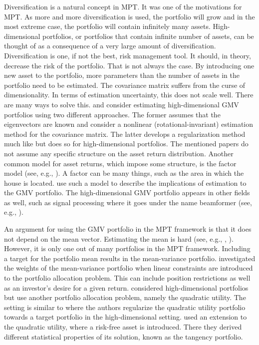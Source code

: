 Diversification is a natural concept in MPT.
It was one of the motivations for MPT.
As more and more diversification is used, the portfolio will grow and in the most extreme case, the portfolio will contain infinitely many assets.
High-dimensional portfolios, or portfolios that contain infinite number of assets, can be thought of as a consequence of a very large amount of diversification.
Diversification is one, if not the best, risk management tool.
It should, in theory, decrease the risk of the portfolio. 
That is not always the case.
By introducing one new asset to the portfolio, more parameters than the number of assets in the portfolio need to be estimated. 
The covariance matrix suffers from the curse of dimensionality. 
In terms of estimation uncertainty, this does not scale well.
There are many ways to solve this.
\citet{lw20} and \citet{bodnar2018estimation} consider estimating high-dimensional GMV portfolios using two different approaches.
The former assumes that the eigenvectors are known and consider a nonlinear (rotational-invariant) estimation method for the covariance matrix. 
The latter develops a regularization method much like \citet{frahm2010} but does so for high-dimensional portfolios.
The mentioned papers do not assume any specific structure on the asset return distribution. 
Another common model for asset returns, which impose some structure, is the factor model (see, e.g., \citep{ross2013arbitrage}). 
A factor can be many things, such as the area in which the house is located.
\citet{ding2020high} use such a model to describe the implications of estimation to the GMV portfolio.
The high-dimensional GMV portfolio appears in other fields as well, such as signal processing where it goes under the name beamformer (see, e.g., \citet{LiStoicaWang2004}). 

An argument for using the GMV portfolio in the MPT framework is that it does not depend on the mean vector.
Estimating the mean is hard (see, e.g., \citet{merton1980estimating}, \citet{best1991sensitivity}).
However, it is only one out of many portfolios in the MPT framework.
Including a target for the portfolio mean results in the mean-variance portfolio.
\citet{el2010high} investigated the weights of the mean-variance portfolio when linear constraints are introduced to the portfolio allocation problem.
This can include position restrictions as well as an investor's desire for a given return.
\citet{bodnarokhrinparolya2020} considered high-dimensional portfolios but use another portfolio allocation problem, namely the quadratic utility.
The setting is similar to \citet{bodnar2018estimation} where the authors regularize the quadratic utility portfolio towards a target portfolio in the high-dimensional setting.
\citet{karlsson2021statistical} used an extension to the quadratic utility, where a risk-free asset is introduced.
There they derived different statistical properties of its solution, known as the tangency portfolio.


